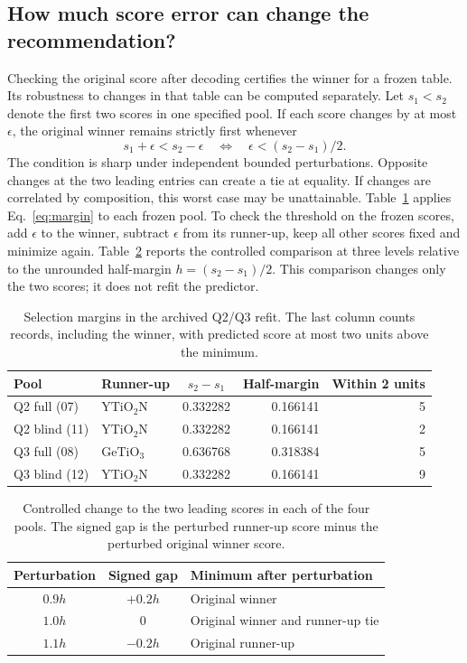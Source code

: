 \subsection{How much score error can change the recommendation?}
Checking the original score after decoding certifies the winner for a frozen table. Its robustness to changes in that table can be computed separately. Let $s_1<s_2$ denote the first two scores in one specified pool. If each score changes by at most $\epsilon$, the original winner remains strictly first whenever
\begin{equation}
 s_1+\epsilon<s_2-\epsilon
 \quad\Longleftrightarrow\quad \epsilon<(s_2-s_1)/2 .
 \label{eq:margin}
\end{equation}
The condition is sharp under independent bounded perturbations. Opposite changes at the two leading entries can create a tie at equality. If changes are correlated by composition, this worst case may be unattainable. Table~\ref{tab:margins} applies Eq.~\eqref{eq:margin} to each frozen pool. To check the threshold on the frozen scores, add $\epsilon$ to the winner, subtract $\epsilon$ from its runner-up, keep all other scores fixed and minimize again. Table~\ref{tab:perturbation} reports the controlled comparison at three levels relative to the unrounded half-margin $h=(s_2-s_1)/2$. This comparison changes only the two scores; it does not refit the predictor.

\begin{table}[htbp]
\caption{Selection margins in the archived Q2/Q3 refit. The last column counts records, including the winner, with predicted score at most two units above the minimum.}\label{tab:margins}
\centering\small\begin{tabular}{llrrr}
\toprule Pool & Runner-up & \multicolumn{1}{c}{$s_2-s_1$} & \multicolumn{1}{c}{Half-margin} & Within 2 units\\\midrule
Q2 full (07) & $\mathrm{YTiO_2N}$ & 0.332282 & 0.166141 & 5\\
Q2 blind (11) & $\mathrm{YTiO_2N}$ & 0.332282 & 0.166141 & 2\\
Q3 full (08) & $\mathrm{GeTiO_3}$ & 0.636768 & 0.318384 & 5\\
Q3 blind (12) & $\mathrm{YTiO_2N}$ & 0.332282 & 0.166141 & 9\\\bottomrule
\end{tabular}
\end{table}

\begin{table}[htbp]
\caption{Controlled change to the two leading scores in each of the four pools. The signed gap is the perturbed runner-up score minus the perturbed original winner score.}\label{tab:perturbation}
\centering\small\begin{tabular}{ccl}
\toprule Perturbation & Signed gap & Minimum after perturbation\\\midrule
$0.9h$ & $+0.2h$ & Original winner\\
$1.0h$ & $0$ & Original winner and runner-up tie\\
$1.1h$ & $-0.2h$ & Original runner-up\\\bottomrule
\end{tabular}
\end{table}

